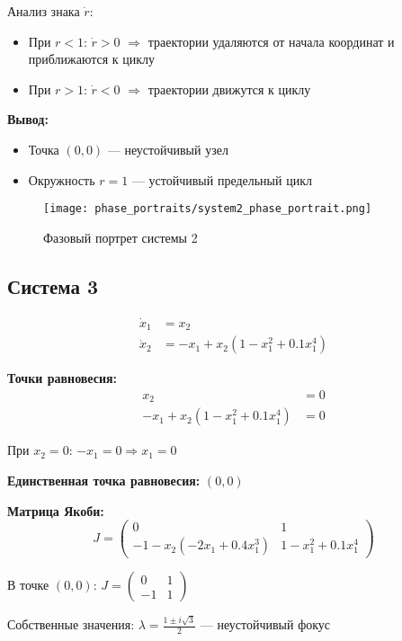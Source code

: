 Анализ знака $\dot{r}$:
\begin{itemize}
\item При $r < 1$: $\dot{r} > 0$ $\Rightarrow$ траектории удаляются от начала координат и приближаются к циклу
\item При $r > 1$: $\dot{r} < 0$ $\Rightarrow$ траектории движутся к циклу
\end{itemize}

\textbf{Вывод:}
\begin{itemize}
\item Точка $(0,0)$ --- неустойчивый узел
\item Окружность $r = 1$ --- устойчивый предельный цикл
\end{itemize}

\begin{figure}[H]
\centering
\texttt{[image: phase\_portraits/system2\_phase\_portrait.png]}
\caption{Фазовый портрет системы 2}
\label{fig:system2_phase_portrait}
\end{figure}

\subsection*{Система 3}

\begin{align}
\dot{x}_1 &= x_2 \\
\dot{x}_2 &= -x_1 + x_2(1 - x_1^2 + 0.1x_1^4)
\end{align}

\textbf{Точки равновесия:}
\begin{align}
x_2 &= 0 \\
-x_1 + x_2(1 - x_1^2 + 0.1x_1^4) &= 0
\end{align}

При $x_2 = 0$: $-x_1 = 0 \Rightarrow x_1 = 0$

\textbf{Единственная точка равновесия:} $(0, 0)$

\textbf{Матрица Якоби:}
$$J = \begin{pmatrix} 0 & 1 \\ -1 - x_2(-2x_1 + 0.4x_1^3) & 1 - x_1^2 + 0.1x_1^4 \end{pmatrix}$$

В точке $(0, 0)$: $J = \begin{pmatrix} 0 & 1 \\ -1 & 1 \end{pmatrix}$

Собственные значения: $\lambda = \frac{1 \pm i\sqrt{3}}{2}$ --- неустойчивый фокус

